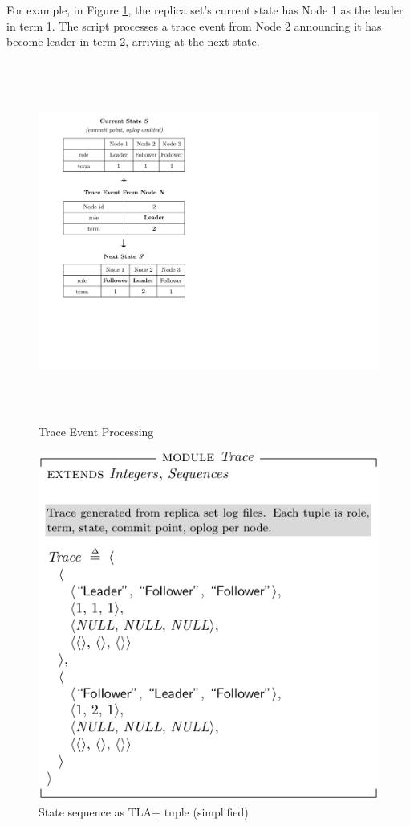 \documentclass{vldb}
\begin{document}
For example, in Figure \ref{figure:event-processing}, the replica set's current state has Node 1 as the leader in term 1. 
The script processes a trace event from Node 2 announcing it has become leader in term 2, arriving at the next state.

\begin{figure}
\includegraphics[height=32em]{event-processing.pdf}
\caption{Trace Event Processing}
\label{figure:event-processing}
\end{figure}

\begin{figure}
\includegraphics{Trace.pdf}
\caption{State sequence as TLA+ tuple (simplified)}
\label{fig:state-sequence}
\end{figure}
\end{document}
